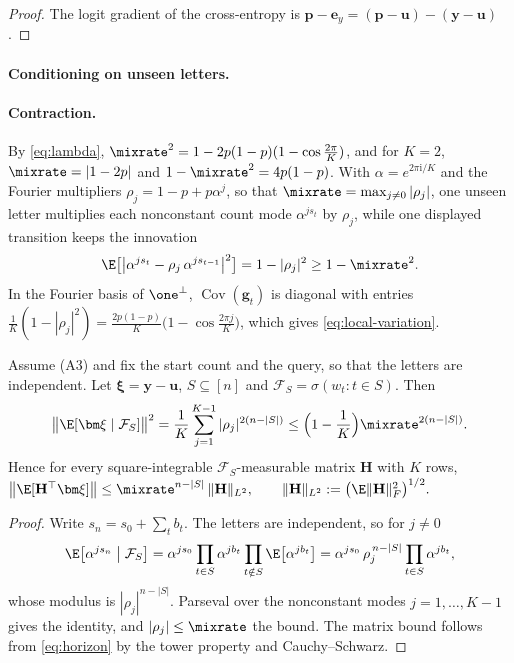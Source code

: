 \begin{proof}
The logit gradient of the cross-entropy is $\bm p-\bm e_y=(\bm p-\bm u)-(\bm y-\bm u)$.
\end{proof}

\paragraph{Conditioning on unseen letters.}
\label{app:target-spectrum}

\paragraph{Contraction.}\label{app:contraction} By \cref{eq:lambda}, $\mixrate^2=1-2p(1-p)(1-\cos\tfrac{2\pi}{K})$, and for $K=2$,
$\mixrate=|1-2p|$ and $1-\mixrate^2=4p(1-p)$. With $\alpha=e^{2\pi\mathrm i/K}$ and the Fourier multipliers
$\rho_j=1-p+p\alpha^j$, so that $\mixrate=\max_{j\ne0}|\rho_j|$, one unseen letter multiplies each nonconstant count
mode $\alpha^{js_t}$ by $\rho_j$, while one displayed transition keeps the innovation
\begin{equation}
 \E\bigl[\bigl|\alpha^{j s_t}-\rho_j\,\alpha^{j s_{t-1}}\bigr|^2\bigr]=1-|\rho_j|^2\ge1-\mixrate^2 .
 \label{eq:move-variance}
\end{equation}
In the Fourier basis of $\one^\perp$, $\operatorname{Cov}(\bm g_t)$ is diagonal with entries $\tfrac{1}{K}(1-|\rho_j|^2)=\tfrac{2p(1-p)}{K}\bigl(1-\cos\tfrac{2\pi j}{K}\bigr)$,
which gives \cref{eq:local-variation}.

\begin{lemma}
\label{lem:target-contraction}
Assume (A3) and fix the start count and the query, so that the letters are independent. Let $\bm\xi=\bm y-\bm u$, $S\subseteq[n]$ and $\mathcal F_S=\sigma(w_t:t\in S)$. Then
\begin{equation}
 \bigl\|\E[\bm\xi\mid\mathcal F_S]\bigr\|^2=\frac{1}{K}\sum_{j=1}^{K-1}|\rho_j|^{2(n-|S|)}\le\Bigl(1-\frac{1}{K}\Bigr)\mixrate^{2(n-|S|)} .
 \label{eq:horizon}
\end{equation}
Hence for every square-integrable $\mathcal F_S$-measurable matrix $\mathbf H$ with $K$ rows,
 $\bigl\|\E[\mathbf H^\top\bm\xi]\bigr\|\le\mixrate^{n-|S|}\,\|\mathbf H\|_{L^2},\qquad \|\mathbf H\|_{L^2}:=\bigl(\E\|\mathbf H\|_F^2\bigr)^{1/2}.$ 
\end{lemma}

\begin{proof}
Write $s_n=s_0+\sum_tb_t$. The letters are independent, so for $j\ne0$
\[
 \E\bigl[\alpha^{js_n}\bigm|\mathcal F_S\bigr]=\alpha^{js_0}\prod_{t\in S}\alpha^{jb_t}\prod_{t\notin S}\E\bigl[\alpha^{jb_t}\bigr]=\alpha^{js_0}\,\rho_j^{\,n-|S|}\prod_{t\in S}\alpha^{jb_t},
\]
whose modulus is $|\rho_j|^{n-|S|}$. Parseval over the nonconstant modes $j=1,\ldots,K-1$ gives the identity, and $|\rho_j|\le\mixrate$ the bound.
The matrix bound follows from \cref{eq:horizon} by the tower property
and Cauchy--Schwarz.
\end{proof}

